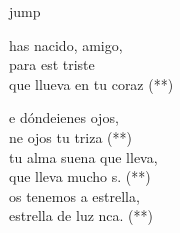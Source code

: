 \begin{cancion}jump\\
	\begin{chorus}%
		has nacido, amigo,\\
		para est triste\\
		que llueva en tu coraz (**)\jump\\
	\end{chorus}%
	e dóndeienes ojos,\\
	ne ojos tu triza (**)\\
	tu alma suena  que lleva,\\
	que lleva mucho s. (**)\\
	\jump
	os tenemos a estrella,\\
	 estrella de luz nca. (**)\\
	\jump
\end{cancion}%
